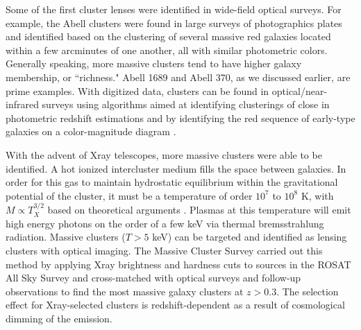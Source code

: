 Some of the first cluster lenses were identified in wide-field optical surveys. For example, the Abell clusters \citep{Abell:1958mz,Zwicky:1968rm,Abell:1989ly} were found in large surveys of photographics plates and identified based on the clustering of several massive red galaxies located within a few arcminutes of one another, all with similar photometric colors. Generally speaking, more massive clusters tend to have higher galaxy membership, or ``richness." Abell 1689 and Abell 370, as we discussed earlier, are prime examples. With digitized data, clusters can be found in optical/near-infrared surveys using algorithms aimed at identifying clusterings of close in photometric redshift estimations \citep{Rykoff:2014rz} and by identifying the red sequence of early-type galaxies on a color-magnitude diagram \citep{Gladders:2000kq}.

With the advent of Xray telescopes, more massive clusters were able to be identified. A hot ionized intercluster medium fills the space between galaxies. In order for this gas to maintain hydrostatic equilibrium within the gravitational potential of the cluster, it must be a temperature of order $10^7$ to $10^8$ K, with $M\propto T_X^{3/2}$ based on theoretical arguments \citep{Horner:1999rz}. Plasmas at this temperature will emit high energy photons on the order of a few keV via thermal bremsstrahlung radiation. Massive clusters ($T>5$ keV) can be targeted and identified as lensing clusters with optical imaging. The Massive Cluster Survey \citep[MACS; ][]{Ebeling:2001rt} carried out this method by applying Xray brightness and hardness cuts to sources in the ROSAT All Sky Survey and cross-matched with optical surveys and follow-up observations to find the most massive galaxy clusters at $z>0.3$. The selection effect for Xray-selected clusters is redshift-dependent as a result of cosmological dimming of the emission.

